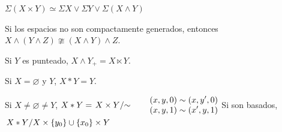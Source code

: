 \begin{tcolorbox}[colback=blue!5!white,colframe=blue!75!blue,title=\textbf{Proposición}.]
    \begin{center}
        \(\Sigma(X\times Y)\simeq \Sigma X \vee \Sigma Y \vee \Sigma(X\wedge Y)\)
    \end{center}
\end{tcolorbox}

\begin{tcolorbox}[colback=antiquefuchsia!15!white,colframe=antiquefuchsia!75!black,title=\textbf{Observación}]
    Si los espacios no son compactamente generados, entonces \(X\wedge (Y\wedge Z)\ncong (X\wedge Y) \wedge Z\).
\end{tcolorbox}

\begin{tcolorbox}[colback=white!15!white,colframe=red!75!black,title=\textbf{Half smash}\index{half smash}]
    Si \(Y\) es punteado, \(X\wedge Y_{+}= X \ltimes Y\).
\end{tcolorbox}


\begin{tcolorbox}[colback=white!15!white,colframe=red!75!black,title=\textbf{Join}\index{join}]
    Si \(X=\varnothing\) y \(Y\), \(X\ast Y=Y\).
    
    Si \(X\neq\varnothing\neq Y\), \(X\ast Y=\left.X\times Y\middle/\sim\right.
    \qquad 
    \begin{aligned}
        (x, y, 0)&\sim(x, y', 0)\\[-3pt]
        (x, y, 1)&\sim(x', y, 1)\\
    \end{aligned}\)
\tcblower
    Si son basados, \(\left.X\ast Y\middle/X\times\{y_0\}\cup \{x_0\}\times Y\right.\)
\end{tcolorbox}


